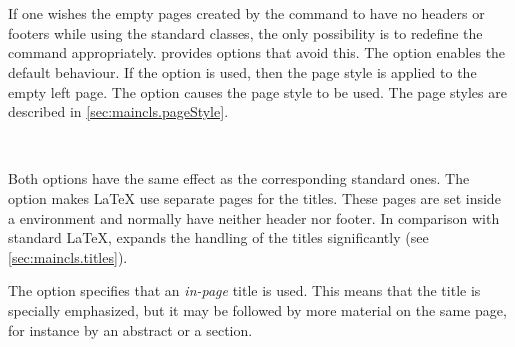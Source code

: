 \begin{Declaration}
  \\
  \\
\end{Declaration}%
%
%
%
If one wishes the empty pages created by the 
command to have no headers or footers while using the standard
classes, the only possibility is to redefine the command
appropriately. {\KOMAScript} provides options that avoid this. The
option  enables the default
 behaviour. If the option
 is used, then the
 page style is applied to the
empty left page. The option  causes the
 page style to be used. The page
styles are described in \autoref{sec:maincls.pageStyle}.
%
%
%
%


\begin{Declaration}
  \\
\end{Declaration}%
%
%
Both options have the same effect as the corresponding standard ones.
The  option makes {\LaTeX} use separate pages for
the titles.  These pages are set inside a 
environment and normally have neither header nor footer. In comparison
with standard \LaTeX, \KOMAScript{} expands the handling of the titles
significantly (see \autoref{sec:maincls.titles}).

The option  specifies that an \emph{in-page} title
is used. This means that the title is specially emphasized, but it may
be followed by more material on the same page, for instance by an
abstract or a section.
%
%
%


